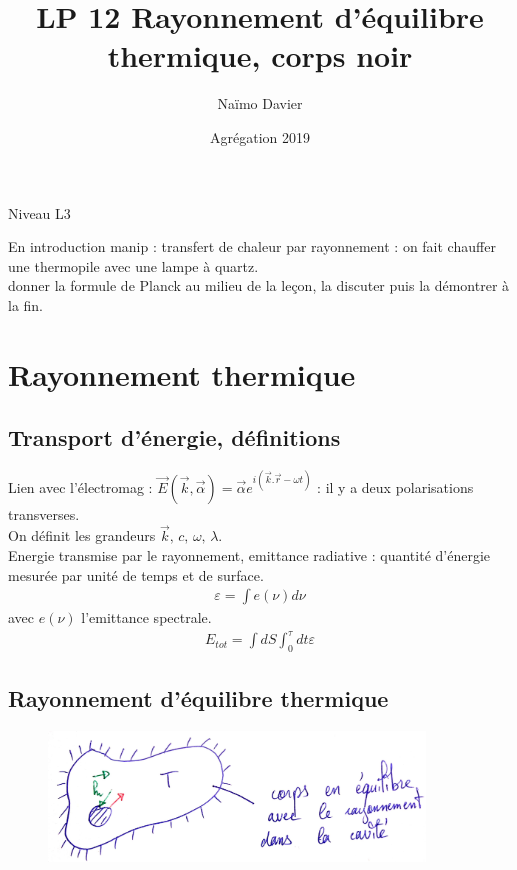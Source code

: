 \documentclass[12pt,prb,aps,epsf]{article}
\begin{document}
	
	\title{LP 12 Rayonnement d'équilibre thermique, corps noir}
		\author{Naïmo Davier}
		\date{Agrégation 2019}
		
	\maketitle
	
	\tableofcontents
	
	\pagebreak
	
Niveau L3

En introduction manip : transfert de chaleur par rayonnement : on fait chauffer une thermopile avec une lampe à quartz.\\
donner la formule de Planck au milieu de la leçon, la discuter puis la démontrer à la fin.
	
	
\section{Rayonnement thermique}
\subsection{Transport d'énergie, définitions}
Lien avec l'électromag : $\vec{E}(\vec{k},\vec{\alpha}) = \vec{\alpha}e^{i(\vec{k}.\vec{r}-\omega t)}$ : il y a deux polarisations transverses.\\ 
On définit les grandeurs $\vec{k},\,c,\,\omega,\,\lambda$.\\
Energie transmise par le rayonnement, emittance radiative : quantité d'énergie mesurée par unité de temps et de surface.
\begin{eqnarray}
\varepsilon = \int e(\nu)d\nu
\end{eqnarray}
avec $e(\nu)$ l'emittance spectrale.
\begin{eqnarray}
E_{tot} = \int dS \int_0^{\tau} dt \varepsilon
\end{eqnarray}

\subsection{Rayonnement d'équilibre thermique}
\begin{figure}[h]
	\centering \includegraphics[width=10cm]{corps_noir}
\end{figure}
\end{document}
